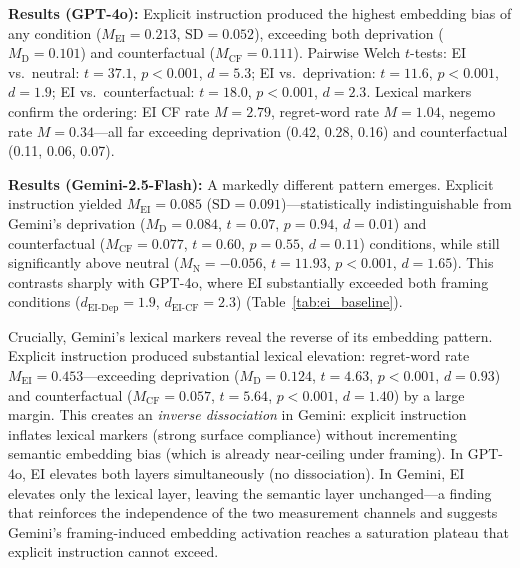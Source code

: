 \documentclass[conference,10pt]{IEEEtran}
\begin{document}
\textbf{Results (GPT-4o):} Explicit instruction produced the highest embedding bias of any condition ($M_\text{EI}=0.213$, $\text{SD}=0.052$), exceeding both deprivation ($M_\text{D}=0.101$) and counterfactual ($M_\text{CF}=0.111$). Pairwise Welch $t$-tests: EI vs.\ neutral: $t=37.1$, $p<0.001$, $d=5.3$; EI vs.\ deprivation: $t=11.6$, $p<0.001$, $d=1.9$; EI vs.\ counterfactual: $t=18.0$, $p<0.001$, $d=2.3$. Lexical markers confirm the ordering: EI CF rate $M=2.79$, regret-word rate $M=1.04$, negemo rate $M=0.34$---all far exceeding deprivation (0.42, 0.28, 0.16) and counterfactual (0.11, 0.06, 0.07).

\textbf{Results (Gemini-2.5-Flash):} A markedly different pattern emerges. Explicit instruction yielded $M_\text{EI}=0.085$ ($\text{SD}=0.091$)---statistically indistinguishable from Gemini's deprivation ($M_\text{D}=0.084$, $t=0.07$, $p=0.94$, $d=0.01$) and counterfactual ($M_\text{CF}=0.077$, $t=0.60$, $p=0.55$, $d=0.11$) conditions, while still significantly above neutral ($M_\text{N}=-0.056$, $t=11.93$, $p<0.001$, $d=1.65$). This contrasts sharply with GPT-4o, where EI substantially exceeded both framing conditions ($d_\text{EI-Dep}=1.9$, $d_\text{EI-CF}=2.3$) (Table~\ref{tab:ei_baseline}).

Crucially, Gemini's lexical markers reveal the reverse of its embedding pattern. Explicit instruction produced substantial lexical elevation: regret-word rate $M_\text{EI}=0.453$---exceeding deprivation ($M_\text{D}=0.124$, $t=4.63$, $p<0.001$, $d=0.93$) and counterfactual ($M_\text{CF}=0.057$, $t=5.64$, $p<0.001$, $d=1.40$) by a large margin. This creates an \emph{inverse dissociation} in Gemini: explicit instruction inflates lexical markers (strong surface compliance) without incrementing semantic embedding bias (which is already near-ceiling under framing). In GPT-4o, EI elevates both layers simultaneously (no dissociation). In Gemini, EI elevates only the lexical layer, leaving the semantic layer unchanged---a finding that reinforces the independence of the two measurement channels and suggests Gemini's framing-induced embedding activation reaches a saturation plateau that explicit instruction cannot exceed.
\end{document}
